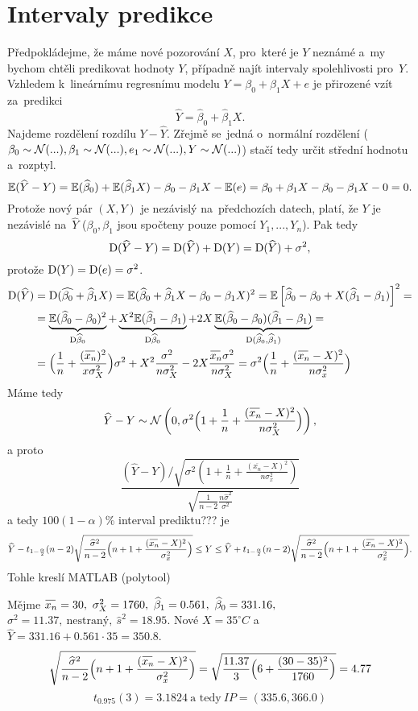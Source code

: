\section{Intervaly predikce}
Předpokládejme, že máme nové pozorování $X$, pro~které je $Y$ neznámé a~my bychom chtěli predikovat hodnoty $Y$, případně najít intervaly spolehlivosti pro~$Y$. Vzhledem k~lineárnímu regresnímu modelu $Y=\beta_0+\beta_1 X + e$ je přirozené vzít za~predikci
$$\widehat{Y}=\widehat{\beta}_0+\widehat{\beta}_1X .$$
Najdeme rozdělení rozdílu $Y-\widehat{Y}$. Zřejmě se~jedná o~normální rozdělení ($\beta_0\sim \mathcal{N}(...),\\ \beta_1 \sim \mathcal{N}(...),e_1 \sim \mathcal{N}(...), Y \sim \mathcal{N}(...)$) stačí tedy určit střední hodnotu a~rozptyl.
$$\mathbb{E}(\widehat{Y}-Y)=\mathbb{E}(\widehat{\beta}_0)+\mathbb{E}(\widehat{\beta}_1X)-\beta_0-\beta_1 X-\mathbb{E}(e)=\beta_0+\beta_1 X-\beta_0-\beta_1 X -0=0. $$
Protože nový pár $(X,Y)$ je nezávislý na~předchozích datech, platí, že $Y$ je nezávislé na~$\widehat{Y}$ ($\beta_0,\beta_1$ jsou spočteny pouze pomocí $Y_1,...,Y_n$). Pak tedy
$$\mathrm{D} (\widehat{Y}-Y)=\mathrm{D} (\widehat{Y})+\mathrm{D} (Y)=\mathrm{D} (\widehat{Y})+\sigma^2,$$
protože $\mathrm{D} (Y)=\mathrm{D} (e)=\sigma^2$.
\[
\begin{split}
\D (\widehat{Y})&=\D (\widehat{\beta_0}+\widehat{\beta}_1X)=\E(\widehat{\beta}_0+\widehat{\beta}_1X-\beta_0-\beta_1 X)^2=\EE{\widehat{\beta}_0-\beta_0+X(\widehat{\beta}_1-\beta_1)}^2=\\
&=\underbrace{\E(\widehat{\beta}_0-\beta_0)^2}_{\D \widehat{\beta}_0}+\underbrace{X^2\E(\widehat{\beta}_1-\beta_1)}_{\D \widehat{\beta}_0}+2X\underbrace{\E(\widehat{\beta}_0-\beta_0)(\widehat{\beta}_1-\beta_1)}_{\D(\widehat{\beta}_0,\widehat{\beta}_1)}=\\
&=\Br{\frac{1}{n}+\frac{(\oxnn)^2}{x\sigma_X^2}}\sigma^2+X^2\frac{\sigma^2}{n\sigma_X^2}-2X\frac{\oxnn\sigma^2}{n\sigma_X^2}=\sigma^2\Br{\frac{1}{n}+\frac{(\oxnn-X)^2}{n\sigma_x^2}}
\end{split}
\]
Máme tedy
$$\widehat{Y}-Y \sim \n{0, \sigma^2\Br{1+\frac{1}{n}+\frac{(\oxnn-X)^2}{n\sigma_X^2}} },$$
a proto
$$ \frac{{(\widehat{Y}-Y)}\Big/{\sqrt{\sigma^2(1+\frac{1}{n}+\frac{(\overline{x_n}-X)^2}{n\sigma_x^2})}}}{\sqrt{\frac{1}{n-2}\frac{n\widehat{\sigma}^2}{\sigma^2}}}$$
a tedy $100(1-\alpha)$\% interval prediktu??? je
$$\widehat{Y}-t_{1-\frac{\alpha}{2}}(n-2)\sqrt{\frac{\widehat{\sigma}^2}{n-2}\Br{n+1+\frac{(\oxnn-X)^2}{\sigma_x^2}}} \leq Y \leq \widehat{Y}+t_{1-\frac{\alpha}{2}}(n-2)\sqrt{\frac{\widehat{\sigma}^2}{n-2}\Br{n+1+\frac{(\oxnn-X)^2}{\sigma_x^2}}}.$$
Tohle kreslí MATLAB (polytool)
\begin{example}Mějme 
$\oxnn=30, ~\sigma_X^2=1760,~\widehat{\beta}_1=0.561,~\widehat{\beta}_0=331.16,~$\\$\sigma^2=11.37,~ \text{nestraný},~\widehat{s}^2=18.95$.
Nové $X=35^\circ C$ a~$\widehat{Y}=331.16+0.561\cdot 35=350.8$.
$$\sqrt{\frac{\widehat{\sigma}^2}{n-2}\Br{n+1+\frac{(\oxnn-X)^2}{\sigma_x^2}}}=\sqrt{\frac{11.37}{3}\Br{6+\frac{(30-35)^2}{1760}}}=4.77 $$
$$t_{0.975}(3)=3.1824 ~ \text{a tedy}~IP=(335.6,366.0)$$
\end{example}

